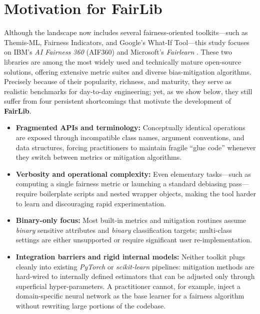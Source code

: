 \documentclass[12pt,a4paper,openright,twoside]{book}
\begin{document}
\section{Motivation for FairLib}
Although the landscape now includes several fairness-oriented toolkits—such as Themis-ML, Fairness Indicators, and Google’s What-If Tool—this study focuses on IBM’s \textit{AI Fairness 360} (AIF360) \cite{bellamy2019aif360} and Microsoft’s \textit{Fairlearn} \cite{bird2020fairlearn}. These two libraries are among the most widely used and technically mature open-source solutions, offering extensive metric suites and diverse bias-mitigation algorithms. Precisely because of their popularity, richness, and maturity, they serve as realistic benchmarks for day-to-day engineering; yet, as we show below, they still suffer from four persistent shortcomings that motivate the development of \textbf{FairLib}.

\begin{itemize}
  \item \textbf{Fragmented APIs and terminology:}  
  Conceptually identical operations are exposed through incompatible
  class names, argument conventions, and data structures, forcing practitioners
  to maintain fragile “glue code” whenever they switch between metrics or
  mitigation algorithms.

  \item \textbf{Verbosity and operational complexity:}  
  Even elementary tasks—such as computing a single fairness metric or launching
  a standard debiasing pass—require boilerplate scripts and nested wrapper
  objects, making the tool harder to learn and discouraging rapid experimentation.

  \item \textbf{Binary-only focus:}
  Most built-in metrics and mitigation routines assume \emph{binary} sensitive
  attributes and \emph{binary} classification targets; multi-class settings are
  either unsupported or require significant user re-implementation.

  \item \textbf{Integration barriers and rigid internal models:}  
  Neither toolkit plugs cleanly into existing \textit{PyTorch} or
  \textit{scikit-learn} pipelines: mitigation methods are hard-wired to
  internally defined estimators that can be adjusted only through superficial
  hyper-parameters.  A practitioner cannot, for example, inject a
  domain-specific neural network as the base learner for a fairness algorithm
  without rewriting large portions of the codebase.
\end{itemize}
\end{document}
